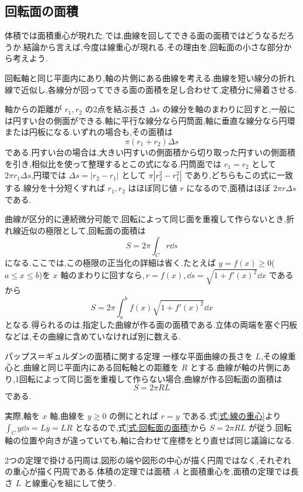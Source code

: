 \subsection{回転面の面積}

体積では面積重心が現れた.では,曲線を回してできる面の面積ではどうなるだろうか.結論から言えば,今度は線重心が現れる.その理由を,回転面の小さな部分から考えよう.

回転軸と同じ平面内にあり,軸の片側にある曲線を考える.曲線を短い線分の折れ線で近似し,各線分が回ってできる面の面積を足し合わせて,定積分に帰着させる.

軸からの距離が $r_1,r_2$ の2点を結ぶ長さ $\Delta s$ の線分を軸のまわりに回すと,一般には円すい台の側面ができる.軸に平行な線分なら円筒面,軸に垂直な線分なら円環または円板になる.いずれの場合も,その面積は
\[
\pi(r_1+r_2)\Delta s
\]
である.円すい台の場合は,大きい円すいの側面積から切り取った円すいの側面積を引き,相似比を使って整理するとこの式になる.円筒面では $r_1=r_2$ として $2\pi r_1\Delta s$,円環では $\Delta s=|r_2-r_1|$ として $\pi|r_2^2-r_1^2|$ であり,どちらもこの式に一致する.線分を十分短くすれば $r_1,r_2$ はほぼ同じ値 $r$ になるので,面積はほぼ $2\pi r\Delta s$ である.

曲線が区分的に連続微分可能で,回転によって同じ面を重複して作らないとき,折れ線近似の極限として,回転面の面積は
\begin{equation}\label{式:回転面の面積}
S=2\pi\int_C r\dd s
\end{equation}
になる.ここでは,この極限の正当化の詳細は省く.たとえば $y=f(x)\ge0$($a\le x\le b$)を $x$ 軸のまわりに回すなら,\,$r=f(x)$,\,$\dd s=\sqrt{1+f'(x)^2}\dd x$ であるから
\[
S=2\pi\int_a^b f(x)\sqrt{1+f'(x)^2}\dd x
\]
となる.得られるのは,指定した曲線が作る面の面積である.立体の両端を塞ぐ円板などは,その曲線に含めていなければ別に数える.

\begin{theorem}{パップス＝ギュルダンの面積に関する定理}
一様な平面曲線の長さを $L$,その線重心と,曲線と同じ平面内にある回転軸との距離を $R$ とする.曲線が軸の片側にあり,1回転によって同じ面を重複して作らない場合,曲線が作る回転面の面積は
\[
S=2\pi R L
\]
である.
\end{theorem}

実際,軸を $x$ 軸,曲線を $y\ge0$ の側にとれば $r=y$ である.式\eqref{式:線の重心}より $\int_C y\dd s=L\overline y=LR$ となるので,式\eqref{式:回転面の面積}から $S=2\pi RL$ が従う.回転軸の位置や向きが違っていても,軸に合わせて座標をとり直せば同じ議論になる.

2つの定理で掛ける円周は,図形の端や図形の中心が描く円周ではなく,それぞれの重心が描く円周である.体積の定理では面積 $A$ と面積重心を,面積の定理では長さ $L$ と線重心を組にして使う.

